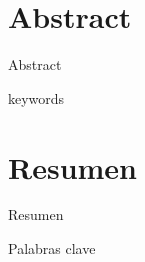 
\chapter*{Abstract}

\begin{abstractEn}
Abstract


\end{abstractEn}

\begin{keywordsEn}
keywords
\end{keywordsEn}

\chapter*{Resumen}

\begin{abstractEs}
Resumen

\end{abstractEs}

\begin{keywordsEs}
Palabras clave
\end{keywordsEs}
